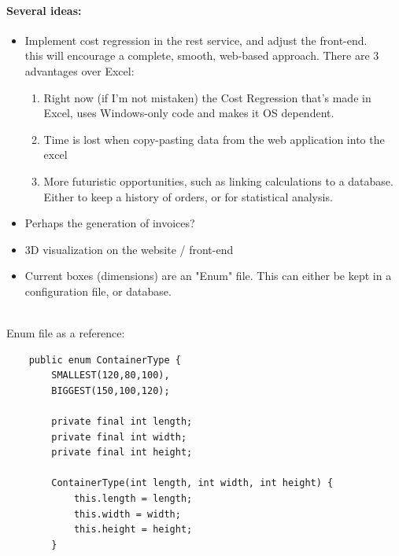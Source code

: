 \documentclass[a4paper,12pt]{article}
\begin{document}
\paragraph{Several ideas:}
\begin{itemize}
	\item Implement cost regression in the rest service, and adjust the front-end. \\
	this will encourage a complete, smooth, web-based approach. There are 3 advantages over Excel:
	\begin{enumerate}
		\item Right now (if I'm not mistaken) the Cost Regression that's made in Excel, uses Windows-only code and makes it OS dependent.
		\item Time is lost when copy-pasting data from the web application into the excel
		\item More futuristic opportunities, such as linking calculations to a database. Either to keep a history of orders, or for statistical analysis.
	\end{enumerate}
	\item Perhaps the generation of invoices?
	\item 3D visualization on the website / front-end
	\item Current boxes (dimensions) are an "Enum" file. This can either be kept in a configuration file, or database. \\ \\
\end{itemize}

Enum file as a reference:
\begin{lstlisting}
	public enum ContainerType {
		SMALLEST(120,80,100),
		BIGGEST(150,100,120);
		
		private final int length;
		private final int width;
		private final int height;
		
		ContainerType(int length, int width, int height) {
			this.length = length;
			this.width = width;
			this.height = height;
		}
\end{lstlisting}
\end{document}
